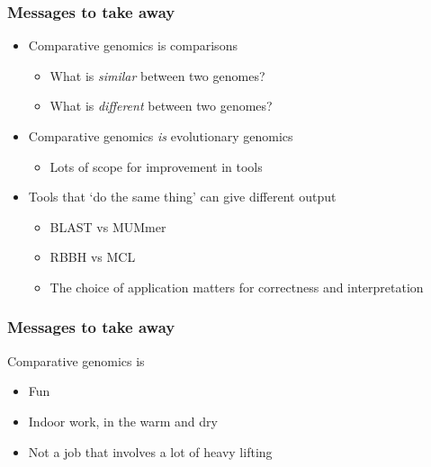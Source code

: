 \begin{frame}
  \frametitle{Messages to take away}
  \begin{itemize}
    \item \textcolor{hutton_green}{Comparative genomics is comparisons}
    \begin{itemize}
      \item What is \textit{similar} between two genomes?
      \item What is \textit{different} between two genomes?
    \end{itemize}
    \item \textcolor{hutton_blue}{Comparative genomics \textit{is} evolutionary genomics}
    \begin{itemize}
      \item Lots of scope for improvement in tools
    \end{itemize}
    \item \textcolor{hutton_purple}{Tools that `do the same thing' can give different output}
    \begin{itemize}
      \item BLAST vs MUMmer
      \item RBBH vs MCL
      \item The choice of application matters for correctness and interpretation
    \end{itemize}
  \end{itemize}
\end{frame}

\begin{frame}
  \frametitle{Messages to take away}
  Comparative genomics is
  \begin{itemize}
    \item \textcolor{hutton_green}{Fun}
    \item \textcolor{hutton_blue}{Indoor work, in the warm and dry}
    \item \textcolor{hutton_purple}{Not a job that involves a lot of heavy lifting}
  \end{itemize}
\end{frame}